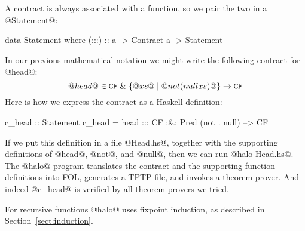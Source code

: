 A contract is always associated with a function, 
so we pair the two in a @Statement@:
\begin{code}
  data Statement where
      (:::) :: a -> Contract a -> Statement
\end{code}
In our previous mathematical notation we might write the following
contract for @head@:
$$
@head@ \in {\tt CF} \;\&\; \{@xs@ \mid @not (null xs)@ \} \rightarrow {\tt CF}
$$
Here is how we express the contract as a Haskell definition:
\begin{comment}
head (x:xs) = x
head []     = error "empty list"

not True = False    null [] = True
not False = True    null xs = False

f . g = \x -> f (g x)
\end{comment}
\begin{code}
c_head :: Statement
c_head = head ::: CF :&: Pred (not . null) --> CF
\end{code}
If we put this definition in a file @Head.hs@, together with the supporting
definitions of @head@, @not@, and @null@, 
then we can run @halo Head.hs@. 
The @halo@ program translates the contract and the supporting function
definitions into
FOL, generates a TPTP file, and invokes a theorem prover.
And indeed @c_head@ is verified by all theorem provers we tried.

For recursive functions @halo@ uses fixpoint induction, as
described in Section~\ref{sect:induction}.

